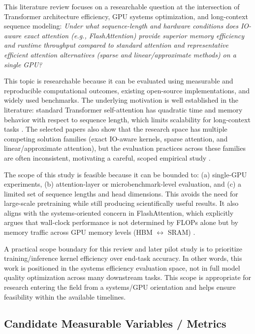 \documentclass[12pt, a4paper]{article}
\begin{document}
This literature review focuses on a researchable question at the intersection of Transformer architecture efficiency, GPU systems optimization, and long-context sequence modeling: \emph{Under what sequence-length and hardware conditions does IO-aware exact attention (e.g., FlashAttention) provide superior memory efficiency and runtime throughput compared to standard attention and representative efficient attention alternatives (sparse and linear/approximate methods) on a single GPU?}

This topic is researchable because it can be evaluated using measurable and reproducible computational outcomes, existing open-source implementations, and widely used benchmarks. The underlying motivation is well established in the literature: standard Transformer self-attention has quadratic time and memory behavior with respect to sequence length, which limits scalability for long-context tasks \parencite{vaswani2023attentionneed, dao2022flashattentionfastmemoryefficientexact}. The selected papers also show that the research space has multiple competing solution families (exact IO-aware kernels, sparse attention, and linear/approximate attention), but the evaluation practices across these families are often inconsistent, motivating a careful, scoped empirical study \parencite{10.1145/3530811, tay2020longrangearenabenchmark, zhang2025cabcomprehensiveattentionbenchmarking}.

The scope of this study is feasible because it can be bounded to: (a) single-GPU experiments, (b) attention-layer or microbenchmark-level evaluation, and (c) a limited set of sequence lengths and head dimensions. This avoids the need for large-scale pretraining while still producing scientifically useful results. It also aligns with the systems-oriented concern in FlashAttention, which explicitly argues that wall-clock performance is not determined by FLOPs alone but by memory traffic across GPU memory levels (HBM $\leftrightarrow$ SRAM) \parencite{dao2022flashattentionfastmemoryefficientexact}.

A practical scope boundary for this review and later pilot study is to prioritize training/inference kernel efficiency over end-task accuracy. In other words, this work is positioned in the systems efficiency evaluation space, not in full model quality optimization across many downstream tasks. This scope is appropriate for research entering the field from a systems/GPU orientation and helps ensure feasibility within the available timelines.

\subsection{Candidate Measurable Variables / Metrics}
\end{document}
